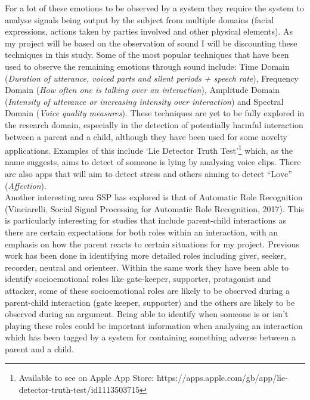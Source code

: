 \documentclass[a4paper,11pt]{report}
\begin{document}
For a lot of these emotions to be observed by a system they require the system to analyse signals being output by the subject from multiple domains (facial expressions, actions taken by parties involved and other physical elements). As my project will be based on the observation of sound I will be discounting these techniques in this study. Some of the most popular techniques that have been used to observe the remaining emotions through sound include: Time Domain (\textit{Duration of utterance, voiced parts and silent periods + speech rate}), Frequency Domain (\textit{How often one is talking over an interaction}), Amplitude Domain (\textit{Intensity of utterance or increasing intensity over interaction}) and Spectral Domain (\textit{Voice quality measures}). These techniques are yet to be fully explored in the research domain, especially in the detection of potentially harmful interaction between a parent and a child, although they have been used for some novelty applications. Examples of this include ‘Lie Detector Truth Test’\footnote{Available to see on Apple App Store: https://apps.apple.com/gb/app/lie-detector-truth-test/id1113503715} which, as the name suggests, aims to detect of someone is lying by analysing voice clips. There are also apps that will aim to detect stress and others aiming to detect “Love” (\textit{Affection}). \\
 
Another interesting area SSP has explored is that of Automatic Role Recognition (Vinciarelli, Social Signal Processing for Automatic Role Recognition, 2017). This is particularly interesting for studies that include parent-child interactions as there are certain expectations for both roles within an interaction, with an emphasis on how the parent reacts to certain situations for my project. Previous work has been done in identifying more detailed roles including giver, seeker, recorder, neutral and orienteer. Within the same work they have been able to identify socioemotional roles like gate-keeper, supporter, protagonist and attacker, some of these socioemotional roles are likely to be observed during a parent-child interaction (gate keeper, supporter) and the others are likely to be observed during an argument. Being able to identify when someone is or isn’t playing these roles could be important information when analysing an interaction which has been tagged by a system for containing something adverse between a parent and a child.\\
\end{document}
